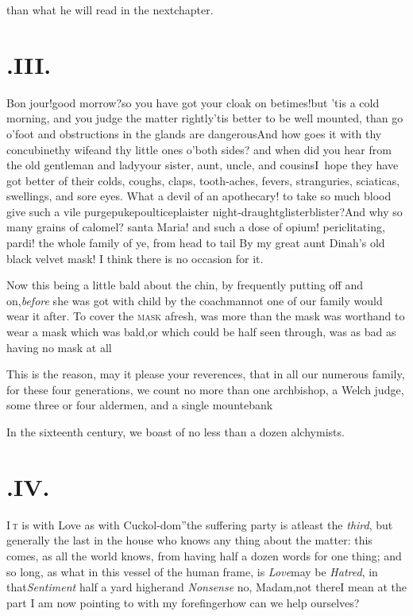 \documentclass{article}
\begin{document}
\newpage
\noindent
than what he will read in the next\break chapter.

\section{.\enspace III.}

\noindent\quad
\tsh Bon jour!\tsh good
morrow?\break\tsh so you have got your cloak on
betimes!\tsh but ’tis a cold morning, and you judge
the matter rightly\tsh ’tis better to be well
mounted, than go \hbox{o’\thinspace foot}\break
\tsh and obstructions in the
glands are dangerous\tsh And how goes it with thy
concubine\tsk thy wife\tsk and thy little ones o’\thinspace both
sides? and when did you hear from the old gentleman and
lady\tsk your sister, aunt, uncle, and cousins\tsk I~hope 
they have got better of their colds, coughs, claps,
tooth-aches, fevers, stranguries, sciaticas, swellings, and sore
eyes.\pb
\tsh What a devil of an apothecary! to take so much blood\tsk
give such a vile purge\tsk puke\tsk poultice\tsk plaister\tsk
night-draught\tsk glister\tsk blister?\tsh And why so many
grains of calomel? santa Maria! and such a dose of opium!
periclitating, pardi! the whole family of ye, from head to tail\tsh 
By my great aunt Dinah’s old black velvet mask! I think
there is no occasion for it.

Now this being a little bald about the chin, by frequently
putting off and on,\break \textit{before} she was got with child by the
coachman\tsk not one of our family would wear it after. To cover
the \textsc{mask} afresh, was more than the mask was
worth\tsh and to wear a mask which was bald,\pb or which
could be half seen through, was as bad as having no mask at
all\tsh

This is the reason, may it please your reverences, that in all
our numerous family, for these four generations, we count no more
than one archbishop, a Welch judge, some three or four
aldermen, and a single mountebank\tsh

In the sixteenth century, we boast of no less than a dozen
alchymists.

\newpage
\section{.\enspace IV.}

\lettrine{\lower-10pt\hbox{\large \lqq}I}{\,t} is with Love as with
Cuckol-\break dom”\tsh the suffering party is at\break least the
\textit{third}, but generally the last in the house who knows any
thing about the matter: this comes, as all the world knows, from
having half a dozen words for one thing; and so long, as what in
this vessel of the human frame, is \textit{Love}\tsk may be
\textit{Hatred}, in that\tsh \textit{Sentiment}\break
half a yard higher\tsh and \textit{Nonsense}\tsh\break
\tsh\!\tsk no, Madam,\tsk not there\tsk I\break
mean at the part I am now
pointing to with my forefinger\tsh how can we help\break
ourselves?
\end{document}
